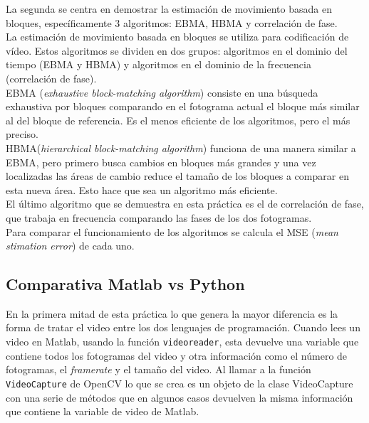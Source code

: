 \documentclass[a4paper,12pt]{report}
\begin{document}
La segunda se centra en demostrar la estimación de movimiento basada en bloques, específicamente 3 algoritmos: EBMA, HBMA y correlación de fase.\\

La estimación de movimiento basada en bloques se utiliza para codificación de vídeo. Estos algoritmos se dividen en dos grupos: algoritmos en el dominio del tiempo (EBMA y HBMA) y algoritmos en el dominio de la frecuencia (correlación de fase).\\

EBMA (\emph{exhaustive block-matching algorithm}) consiste en una búsqueda exhaustiva por bloques comparando en el fotograma actual el bloque más similar al del bloque de referencia. Es el menos eficiente de los algoritmos, pero el más preciso.\\

HBMA(\emph{hierarchical block-matching algorithm}) funciona de una manera similar a EBMA, pero primero busca cambios en bloques más grandes y una vez localizadas las áreas de cambio reduce el tamaño de los bloques a comparar en esta nueva área. Esto hace que sea un algoritmo más eficiente.\\

El último algoritmo que se demuestra en esta práctica es el de correlación de fase, que trabaja en frecuencia comparando las fases de los dos fotogramas.\\

Para comparar el funcionamiento de los algoritmos se calcula el MSE (\emph{mean stimation error}) de cada uno.\\

\subsection{Comparativa Matlab vs Python}

En la primera mitad de esta práctica lo que genera la mayor diferencia es la forma de tratar el video entre los dos lenguajes de programación. Cuando lees un video en Matlab, usando la función \texttt{videoreader}, esta devuelve una variable que contiene todos los fotogramas del video y otra información como el número de fotogramas, el \emph{framerate} y el tamaño del video. Al llamar a la función \texttt{VideoCapture} de OpenCV lo que se crea es un objeto de la clase VideoCapture con una serie de métodos que en algunos casos devuelven la misma información que contiene la variable de video de Matlab.\\
\end{document}
